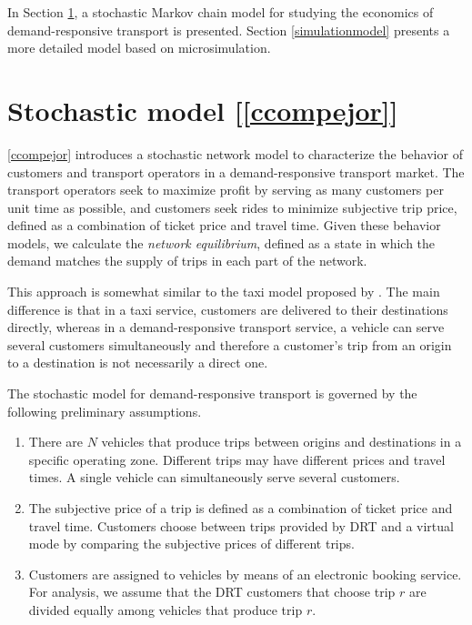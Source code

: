 \documentclass[dissertation,draft*]{aaltoseries}
\begin{document}
In Section \ref{networkmodel}, a stochastic Markov chain model for studying the economics of demand-responsive transport is presented.
Section \ref{simulationmodel} presents a more detailed model based on microsimulation.

\section{Stochastic model [\ref{ccompejor}]}
\label{networkmodel}
\ref{ccompejor} introduces a stochastic network model to characterize the 
behavior of customers and transport operators in a demand-responsive transport market.
The transport operators seek to maximize profit by serving as many customers per unit time as possible, 
and customers seek rides to minimize subjective trip price, defined as a combination of ticket price and travel time. 
Given these behavior models,
we calculate the \emph{network equilibrium}, defined as a state in which the demand matches the supply
of trips in each part of the network. 

This approach is somewhat similar to the taxi model proposed by \cite{yang2010}. The main difference is that in a taxi service, 
customers are delivered to their destinations directly, whereas in a demand-responsive transport service, a vehicle can serve several customers 
simultaneously and therefore a customer's trip from an origin to a destination is not necessarily a direct one. 

The stochastic model for demand-responsive transport is governed by the following preliminary assumptions.
\begin{enumerate}
\item
There are $N$ vehicles that produce trips between 
origins and destinations in a specific operating zone. 
Different trips may have different prices and
travel times. A single vehicle can simultaneously serve several customers.
\item
The subjective price of a trip is defined as a combination of ticket price and travel time.
Customers choose between trips provided by 
DRT and a virtual mode by comparing the subjective 
prices of different trips.
\item
Customers are assigned to vehicles by means of an electronic booking service.
For analysis, we assume that the DRT customers that 
choose trip $r$ are divided equally among vehicles that produce trip $r$. 
\end{enumerate} 

\end{document}
